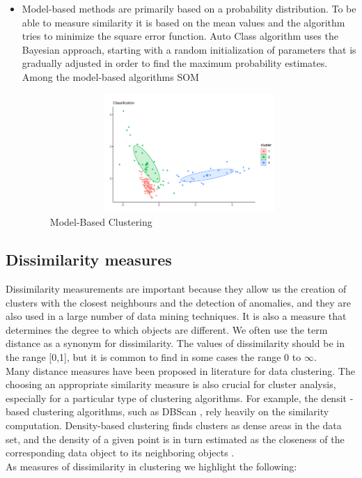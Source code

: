 \begin{itemize}
  \item Model-based methods are primarily based on a probability distribution. To be able to measure similarity it is based on the mean values and the algorithm tries to minimize the square error function. Auto Class algorithm uses the Bayesian approach, starting with a random initialization of parameters that is gradually adjusted in order to find the maximum probability estimates. Among the model-based algorithms SOM \cite{b34}
    \begin{figure}[htbp]
  \centering
   \includegraphics[width=14cm, height=4.5cm]{img/model}
    \caption{Model-Based Clustering}
    \label{fig:model}%
\end{figure}
\end{itemize}

\subsection*{Dissimilarity measures}

Dissimilarity measurements are important because they allow us the creation of clusters with the closest neighbours and the detection of anomalies, and they are also used in a large number of data mining techniques. It is also a measure that determines the degree to which objects are different. We often use the term distance as a synonym for dissimilarity. The values of dissimilarity should be in the range [0,1], but it is common to find in some cases the range 0 to $\infty$.
\\
Many distance measures have been proposed in literature for data clustering. The choosing an appropriate similarity measure is also crucial for cluster analysis, especially for a particular type of clustering algorithms. For example, the densit -based clustering algorithms, such as DBScan \cite{b28}, rely heavily on the similarity computation. Density-based clustering finds clusters as dense areas in the data set, and the density of a given point is in turn estimated as the closeness of the corresponding data object to its neighboring objects \cite{b50} \cite{b51}.
\\
As measures of dissimilarity in clustering we highlight the following:

